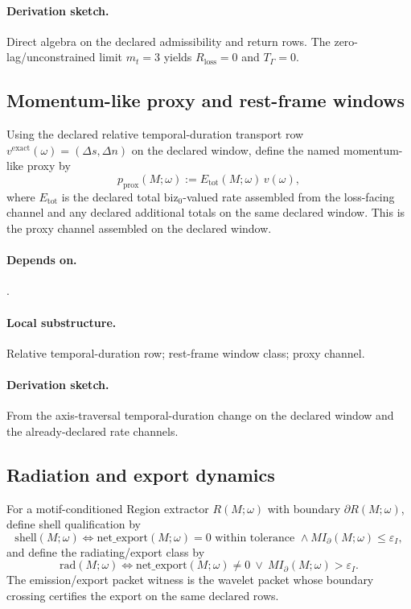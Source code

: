 \paragraph{Derivation sketch.} Direct algebra on the declared admissibility and return rows. The zero-lag/unconstrained limit $m_t=3$ yields $R_{\mathrm{loss}}=0$ and $T_\Gamma=0$.

\subsection{Momentum-like proxy and rest-frame windows}\label{subsec:momentum-proxy}
\begin{definition}
\label{def:momentum-proxy-operator}
Using the declared relative temporal-duration transport row $v^{\mathrm{exact}}(\omega)=(\Delta s,\Delta n)$ on the declared window, define the named momentum-like proxy by
\[
p_{\mathrm{prox}}(M;\omega):=E_{\mathrm{tot}}(M;\omega)\,v(\omega),
\]
where $E_{\mathrm{tot}}$ is the declared total \(\mathrm{biz}_0\)-valued rate assembled from the loss-facing channel and any declared additional totals on the same declared window. This is the proxy channel assembled on the declared window.
\end{definition}

\paragraph{Depends on.} .
\paragraph{Local substructure.} Relative temporal-duration row; rest-frame window class; proxy channel.
\paragraph{Derivation sketch.} From the axis-traversal temporal-duration change on the declared window and the already-declared rate channels.

\subsection{Radiation and export dynamics}\label{subsec:radiation-export-dynamics}
\begin{definition}
\label{def:radiation-dynamics-operator}
For a motif-conditioned Region extractor $R(M;\omega)$ with boundary $\partial R(M;\omega)$, define shell qualification by
\[
\mathrm{shell}(M;\omega)\iff \mathrm{net\_export}(M;\omega)=0\text{ within tolerance }\wedge MI_{\partial}(M;\omega)\le \varepsilon_I,
\]
and define the radiating/export class by
\[
\mathrm{rad}(M;\omega)\iff \mathrm{net\_export}(M;\omega)\neq 0\ \vee\ MI_{\partial}(M;\omega)>\varepsilon_I.
\]
The emission/export packet witness is the wavelet packet whose boundary crossing certifies the export on the same declared rows.
\end{definition}

